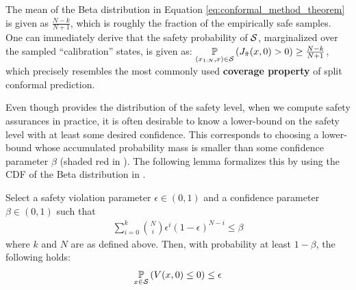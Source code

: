 % 
\begin{remark} \label{remark:CP_coverage}
    The mean of the Beta distribution in Equation \eqref{eq:conformal_method_theorem} is given as $\frac{N-k}{N+1}$, which is roughly the fraction of the empirically safe samples. 
    One can immediately derive that the safety probability of $\mathcal{S}$, marginalized over the sampled ``calibration'' states, is given as: $\underset{ \left( x_{1:N},x \right) \in \mathcal{S}}{\mathbb{P}} \left( J_{\Tilde{\pi}}(x,0) > 0 \right) \ge \frac{N-k}{N+1}$, which precisely resembles the most commonly used \textbf{coverage property} of split conformal prediction.
\end{remark}
% 

Even though  provides the distribution of the safety level, when we compute safety assurances in practice, it is often desirable to know a lower-bound on the safety level with at least some desired confidence.
This corresponds to choosing a lower-bound whose accumulated probability mass is smaller than some confidence parameter $\beta$ (shaded red in ).
The following lemma formalizes this by using the CDF of the Beta distribution in . 
\begin{lemma}
    \label{lemma:conformal_method}
    Select a safety violation parameter $\epsilon \in (0, 1)$ and a confidence parameter $\beta \in (0, 1)$ such that
    \begin{equation} \label{eq:conformal_method_lemma}
        \begin{aligned}
            \sum^k_{i=0} \binom{N}{i} \epsilon^i (1-\epsilon)^{N-i} \le \beta
        \end{aligned}
    \end{equation}
    where $k$ and $N$ are as defined above. 
    Then, with probability at least $1-\beta$, the following holds:
    \begin{equation} \label{eq:conformal_method_lemma_guarantee}
        \begin{aligned}
            \underset{x \in \mathcal{S}}{\mathbb{P}} \left( V(x,0) \le 0 \right) \le \epsilon
        \end{aligned}
    \end{equation}
\end{lemma}
